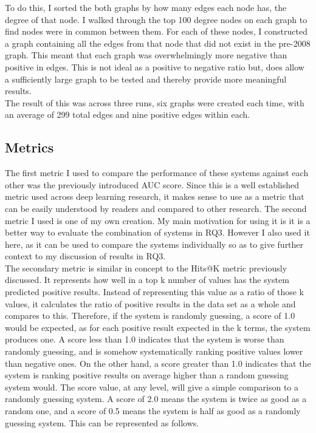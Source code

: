 \documentclass{l4proj}
\begin{document}
To do this, I sorted the both graphs by how many edges each node has, the degree of that node. I walked through the top 100 degree nodes on each graph to find nodes were in common between them. For each of these nodes, I constructed a graph containing all the edges from that node that did not exist in the pre-2008 graph. This meant that each graph was overwhelmingly more negative than positive in edges. This is not ideal as a positive to negative ratio but, does allow a sufficiently large graph to be tested and thereby provide more meaningful results. \\ 

The result of this was across three runs, six graphs were created each time, with an average of 299 total edges and nine positive edges within each. \\

\subsection{Metrics}

The first metric I used to compare the performance of these systems against each other was the previously introduced AUC score. Since this is a well established metric used across deep learning research, it makes sense to use as a metric that can be easily understood by readers and compared to other research. The second metric I used is one of my own creation. My main motivation for using it is it is a better way to evaluate the combination of systems in RQ3. However I also used it here, as it can be used to compare the systems individually so as to give further context to my discussion of results in RQ3. \\ 

The secondary metric is similar in concept to the Hits@K metric previously discussed. It represents how well in a top k number of values has the system predicted positive results. Instead of representing this value as a ratio of those k values, it calculates the ratio of positive results in the data set as a whole and compares to this. Therefore, if the system is randomly guessing, a score of 1.0 would be expected, as for each positive result expected in the k terms, the system produces one. A score less than 1.0 indicates that the system is worse than randomly guessing, and is somehow systematically ranking positive values lower than negative ones. On the other hand, a score greater than 1.0 indicates that the system is ranking positive results on average higher than a random guessing system would. The score value, at any level, will give a simple comparison to a randomly guessing system. A score of 2.0 means the system is twice as good as a random one, and a score of 0.5 means the system is half as good as a randomly guessing system. This can be represented as follows.\\
\end{document}
